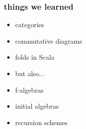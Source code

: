 \documentclass[include/preamble.tex]{subfiles}
\begin{document}
{
  
}







\begin{frame}
  \frametitle{things we learned}
  \begin{itemize}
    \pause
  \item categories
  \item commutative diagrams
  \item folds in Scala
    \newline
    \pause
  \item[] but also...
    \newline
    \pause
  \item f-algebras
    \pause
  \item initial algebras
    \pause
  \item recursion schemes
  \end{itemize}
\end{frame}
\end{document}
